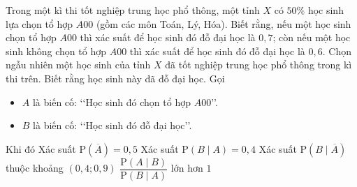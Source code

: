 \begin{ex}%
	Trong một kì thi tốt nghiệp trung học phổ thông, một tỉnh $X$ có $50\%$ học sinh lựa chọn tổ hợp $A00$ (gồm các môn Toán, Lý, Hóa). Biết rằng, nếu một học sinh chọn tổ hợp $A00$ thì xác suất để học sinh đó đỗ đại học là $0{,}7$; còn nếu một học sinh không chọn tổ hợp $A00$ thì xác suất để học sinh đó đỗ đại học là $0{,}6$. Chọn ngẫu nhiên một học sinh của tỉnh $X$ đã tốt nghiệp trung học phổ thông trong kì thi trên. Biết rằng học sinh này đã đỗ đại học. Gọi 
	\begin{itemize}
	\item $A$ là biến cố: \lq\lq Học sinh đó chọn tổ hợp $A00$\rq\rq.
	\item $B$ là biến cố: \lq\lq Học sinh đó đỗ đại học\rq\rq.
	\end{itemize}
	Khi đó
	\choiceTF
	{\True Xác suất $\mathrm{P}\left(\overline{A}\right)=0{,}5$}
	{Xác suất $\mathrm{P}(B\mid A)=0{,}4$}
	{\True Xác suất $\mathrm{P}\left(B\mid \overline{A}\right)$ thuộc khoảng $(0{,}4; 0{,}9)$}
	{$\dfrac{\mathrm{P}(A\mid B)}{\mathrm{P}(B\mid A)}$ lớn hơn $1$}
\end{ex}

